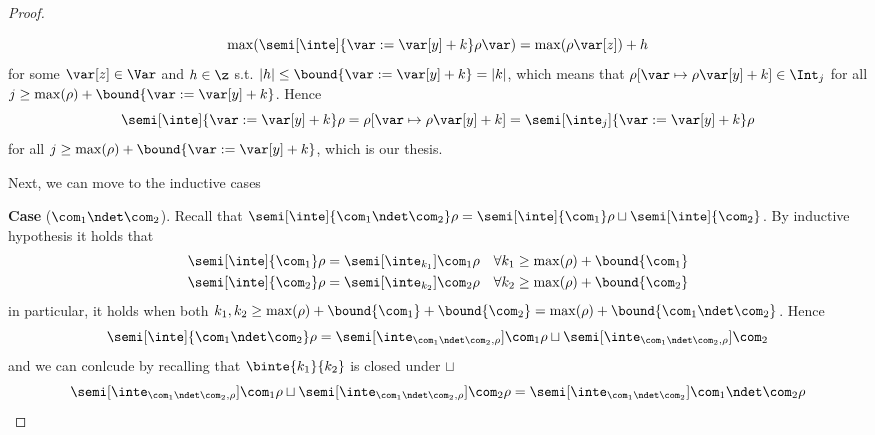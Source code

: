 \begin{proof}
\begin{itemize}
\begin{itemize}
\begin{equation*}
        {\max(\semi[\inte]{\var := \var[y] + k}\rho\var)} = {\max(\rho\var[z]) + h}
      \end{equation*}
      for some \(\var[z] \in \Var\) and \(h \in \z\) s.t.
      \(|h| \leq \bound{\var := \var[y] + k} = |k|\), which means that
      \({\rho[\var \mapsto \rho\var[y] + k]} \in \Int_j\) for all
      \(j \geq \max(\rho) + \bound{\var := \var[y] + k}\).
      Hence
      \begin{equation*}
        \semi[\inte]{\var := \var[y] + k}\rho =
        \rho[\var \mapsto \rho\var[y] + k] =
        \semi[\inte_j]{\var := \var[y] + k}\rho
      \end{equation*}
      for all \(j \geq \max(\rho) + \bound{\var := \var[y] + k}\),
      which is our thesis.
    \end{itemize}
  \end{itemize}
  
  \medskip
  \noindent
  Next, we can move to the inductive cases
  
  \medskip
  
  \noindent
  \textbf{Case} (\(\com_1 \ndet \com_2\)).
  Recall that
  \({\semi[\inte]{\com_1 \ndet \com_2}\rho} =
  {\semi[\inte]{\com_1}\rho} \sqcup {\semi[\inte]{\com_2}}\). By
  inductive hypothesis it holds that
  \begin{align*}
    {\semi[\inte]{\com_1}\rho} & = \semi[\inte_{k_1}]{\com_1}\rho & \forall k_1 \geq \max(\rho) + \bound{\com_1} \\
    {\semi[\inte]{\com_2}\rho} & = \semi[\inte_{k_2}]{\com_2}\rho & \forall k_2 \geq \max(\rho) + \bound{\com_2}
  \end{align*}
  in particular, it holds when both
  \({k_1, k_2} \geq {\max(\rho) + \bound{\com_1} + \bound{\com_2}} =
  {\max(\rho) + \bound{\com_1 \ndet \com_2}}\). Hence
  \begin{equation*}
    {\semi[\inte]{\com_1 \ndet \com_2}\rho} = {\semi[\inte_{\com_1 \ndet \com_2, \rho}]{\com_1}\rho} \sqcup {\semi[\inte_{\com_1 \ndet \com_2, \rho}]{\com_2}}
  \end{equation*}
  and we can conlcude by recalling that \(\binte{k_1}{k_2}\) is closed under
  \(\sqcup\)
  \begin{equation*} {\semi[\inte_{\com_1 \ndet \com_2,
        \rho}]{\com_1}\rho} \sqcup {\semi[\inte_{\com_1 \ndet \com_2,
        \rho}]{\com_2}\rho} = {\semi[\inte_{\com_1\ndet\com_2}]{\com_1
        \ndet \com_2}\rho}
  \end{equation*}

  \medskip
  

\end{proof}
